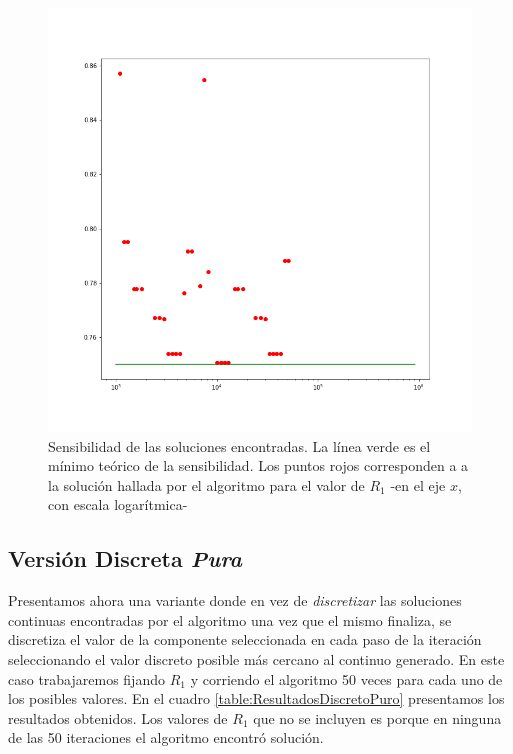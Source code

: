 \documentclass{llncs}
\begin{document}
	\begin{figure}[H]
		\includegraphics[width=\linewidth]{Discreto/sensibilidadVecinos.png}
		\caption{Sensibilidad de las soluciones encontradas. La línea verde es el mínimo teórico de la sensibilidad. Los puntos rojos
		corresponden a a la solución hallada por el algoritmo para el valor de $R_1$ -en el eje $x$, con escala logarítmica-}
		\label{fig:SensibilidadesDiscreto}
	\end{figure}

	\subsection{Versión Discreta \textit{Pura}}
	\label{subsec:VersionDiscretaPura}
	Presentamos ahora una variante donde en vez de \textit{discretizar} las soluciones continuas encontradas por el algoritmo
	una vez que el mismo finaliza, se discretiza el valor de la componente seleccionada en cada paso de la iteración seleccionando
	el valor discreto posible más cercano al continuo generado. En este caso trabajaremos fijando $R_1$ y corriendo el algoritmo 50 veces
	para cada uno de los posibles valores. En el cuadro \ref{table:ResultadosDiscretoPuro}  presentamos los resultados obtenidos. Los valores de $R_1$ que no se incluyen es
	porque en ninguna de las 50 iteraciones el algoritmo encontró solución.
	
\end{document}
